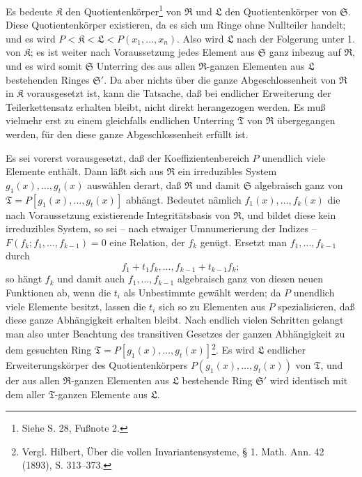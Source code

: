 Es bedeute $\mathfrak K$ den Quotientenkörper\footnote{Siehe S. 28, Fußnote 2.} von $\mathfrak R$ und $\mathfrak L$ den Quotientenkörper von $\mathfrak S$. Diese Quotientenkörper existieren, da es sich um Ringe ohne Nullteiler handelt; und es wird $P<\mathfrak K<\mathfrak L<P(x_1,\ldots,x_n)$. Also wird $\mathfrak L$ nach der Folgerung unter 1.  von $\mathfrak K$; es ist weiter nach Voraussetzung jedes Element aus $\mathfrak S$ ganz inbezug auf $\mathfrak R$, und es wird somit $\mathfrak S$ Unterring des aus allen $\mathfrak R$-ganzen Elementen aus $\mathfrak L$ bestehenden Ringes $\mathfrak S'$. Da aber nichts über die ganze Abgeschlossenheit von $\mathfrak R$ in $\mathfrak K$ vorausgesetzt ist, kann die Tatsache, daß bei endlicher Erweiterung der Teilerkettensatz erhalten bleibt, nicht direkt herangezogen werden. Es muß vielmehr erst zu einem gleichfalls endlichen Unterring $\mathfrak T$ von $\mathfrak R$ übergegangen werden, für den diese ganze Abgeschlossenheit erfüllt ist.

Es sei vorerst vorausgesetzt, daß der Koeffizientenbereich $P$ unendlich viele Elemente enthält. Dann läßt sich aus $\mathfrak R$ ein irreduzibles System $g_1(x),\ldots,g_t(x)$ auswählen derart, daß $\mathfrak R$ und damit $\mathfrak S$ algebraisch ganz von $\mathfrak T=P[g_1(x),\ldots,g_t(x)]$ abhängt. Bedeutet nämlich $f_1(x),\ldots,f_k(x)$ die nach Voraussetzung existierende Integritätsbasis von $\mathfrak R$, und bildet diese kein irreduzibles System, so sei -- nach etwaiger Umnumerierung der Indizes -- $F(f_k;f_1,\ldots,f_{k-1})=0$ eine Relation, der $f_k$ genügt. Ersetzt man $f_1,\ldots,f_{k-1}$ durch
\[
 f_1+t_1f_k,\ldots,f_{k-1}+t_{k-1}f_k;
\]
so hängt $f_k$ und damit auch $f_1,\ldots,f_{k-1}$ algebraisch ganz von diesen neuen Funktionen ab, wenn die $t_i$ als Unbestimmte gewählt werden; da $P$ unendlich viele Elemente besitzt, lassen die $t_i$ sich so zu Elementen aus $P$ spezialisieren, daß diese ganze Abhängigkeit erhalten bleibt. Nach endlich vielen Schritten gelangt man also unter Beachtung des transitiven Gesetzes der ganzen Abhängigkeit zu dem gesuchten Ring $\mathfrak T=P[g_1(x),\ldots,g_t(x)]$\footnote{Vergl. Hilbert, Über die vollen Invariantensysteme, § 1. Math. Ann. 42 (1893), S. 313--373.}. Es wird $\mathfrak L$ endlicher Erweiterungskörper des Quotientenkörpers $P(g_1(x),\ldots,g_t(x))$ von $\mathfrak T$, und der aus allen $\mathfrak R$-ganzen Elementen aus $\mathfrak L$ bestehende Ring $\mathfrak S'$ wird identisch mit dem aller $\mathfrak T$-ganzen Elemente aus $\mathfrak L$.

